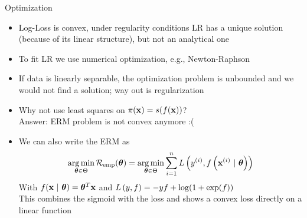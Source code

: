 \documentclass[11pt,compress,t,notes=noshow, xcolor=table]{beamer}
\begin{document}
\begin{vbframe}{Optimization}

\begin{itemize}

\item Log-Loss is convex, under regularity conditions LR has a unique solution (because of its linear structure), but not an analytical one

\item To fit LR we use numerical optimization, e.g., Newton-Raphson

\item If data is linearly separable, the optimization problem is unbounded and we would not find a solution; way out is regularization 

\item Why not use least squares on $\pi(\mathbf{x}) = s(f(\mathbf{x}))$? \\
Answer: ERM problem is not convex anymore :(

\item We can also write the ERM as  
$$
\mathop{\mathrm{arg\,min}}_{\bm{\theta} \in \Theta} \mathcal{R}_{\text{emp}}(\bm{\theta}) = \mathop{\mathrm{arg\,min}}_{\bm{\theta} \in \Theta} \sum\limits_{i=1}^n L\left(y^{(i)}, f\left(\mathbf{x}^{(i)} ~|~ \bm{\theta}\right)\right)
$$
With $f(\mathbf{x} ~|~ \bm{\theta}) = \bm{\theta}^T \mathbf{x}$ and 
$L\left(y, f\right) = -yf + \log(1 + \exp(f)) $\\
\lz
This combines the sigmoid with the loss and shows a convex loss directly on a linear function
\end{itemize}
\end{vbframe}



\endlecture
\end{document}
